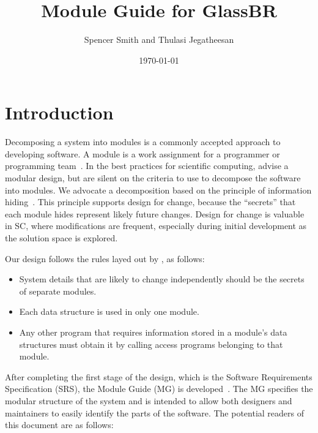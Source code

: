 \documentclass[12pt]{article}
\newcommand{\progname}{GlassBR}
\begin{document}
\title{Module Guide for \progname} 
\author{Spencer Smith and Thulasi Jegatheesan}
\date{\today}
	
\maketitle

\tableofcontents

\newpage

\section{Introduction}

Decomposing a system into modules is a commonly accepted approach to developing
software.  A module is a work assignment for a programmer or programming
team~\citep{ParnasEtAl1984}.  In the best practices for scientific computing,
\citet{WilsonEtAl2013} advise a modular design, but are silent on the criteria
to use to decompose the software into modules.  We advocate a decomposition
based on the principle of information hiding~\citep{Parnas1972a}.  This
principle supports design for change, because the ``secrets'' that each module
hides represent likely future changes.  Design for change is valuable in SC,
where modifications are frequent, especially during initial development as the
solution space is explored.  

Our design follows the rules layed out by \citet{ParnasEtAl1984}, as follows:
\begin{itemize}
\item System details that are likely to change independently should be the
  secrets of separate modules.
\item Each data structure is used in only one module.
\item Any other program that requires information stored in a module's data
  structures must obtain it by calling access programs belonging to that module.
\end{itemize}

After completing the first stage of the design, which is the Software Requirements
Specification (SRS), the Module Guide (MG) is developed~\citep{ParnasEtAl1984}. 
The MG
specifies the modular structure of the system and is intended to allow both
designers and maintainers to easily identify the parts of the software.  The
potential readers of this document are as follows:
\end{document}
